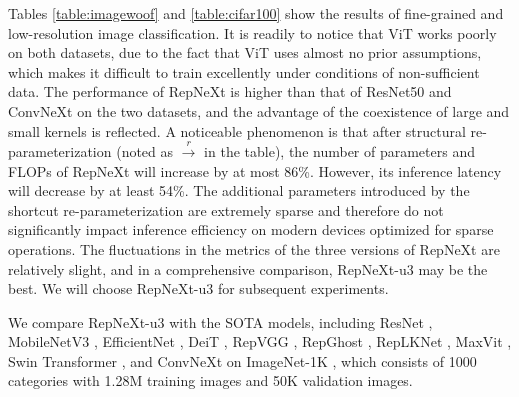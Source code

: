 \documentclass[preprint,12pt]{elsarticle}
\begin{document}
Tables \ref{table:imagewoof} and \ref{table:cifar100} show the results of fine-grained and low-resolution image classification. It is readily to notice that ViT works poorly on both datasets, due to the fact that ViT uses almost no prior assumptions, which makes it difficult to train excellently under conditions of non-sufficient data. The performance of RepNeXt is higher than that of ResNet50 and ConvNeXt on the two datasets, and the advantage of the coexistence of large and small kernels is reflected. A noticeable phenomenon is that after structural re-parameterization (noted as $\stackrel{r}{\rightarrow}$ in the table), the number of parameters and FLOPs of RepNeXt will increase by at most 86\%. However, its inference latency will decrease by at least 54\%. The additional parameters introduced by the shortcut re-parameterization are extremely sparse and therefore do not significantly impact inference efficiency on modern devices optimized for sparse operations. The fluctuations in the metrics of the three versions of RepNeXt are relatively slight, and in a comprehensive comparison, RepNeXt-u3 may be the best. We will choose RepNeXt-u3 for subsequent experiments.

We compare RepNeXt-u3 with the SOTA models, including ResNet \cite{resnet}, MobileNetV3 \cite{mobilenetv3}, EfficientNet \cite{efficientnet}, DeiT \cite{deit}, RepVGG \cite{repvgg}, RepGhost \cite{repghost}, RepLKNet \cite{replknet}, MaxVit \cite{maxvit}, Swin Transformer \cite{swin}, and ConvNeXt \cite{convnext} on ImageNet-1K \cite{imagenet}, which consists of 1000 categories with 1.28M training images and 50K validation images.
\end{document}
